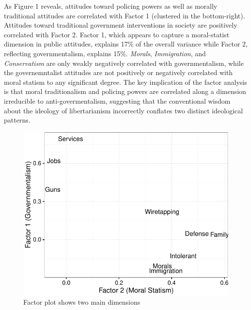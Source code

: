 \documentclass[12pt,]{article}
\begin{document}
As Figure 1 reveals, attitudes toward policing powers as well as morally
traditional attitudes are correlated with Factor 1 (clustered in the
bottom-right). Attitudes toward traditional government interventions in
society are positively correlated with Factor 2. Factor 1, which appears
to capture a moral-statist dimension in public attitudes, explains 17\%
of the overall variance while Factor 2, reflecting governmentalism,
explains 15\%. \emph{Morals}, \emph{Immigration}, and
\emph{Conservatism} are only weakly negatively correlated with
governmentalism, while the governemntalist attitudes are not positively
or negatively correlated with moral statism to any significant degree.
The key implication of the factor analysis is that moral traditionalism
and policing powers are correlated along a dimension irreducible to
anti-govermentalism, suggesting that the conventional wisdom about the
ideology of libertarianism incorrectly conflates two distinct
ideological patterns.

\begin{figure}[htbp]
\centering
\includegraphics{figures/factorplot-1.pdf}
\caption{Factor plot shows two main dimensions}
\end{figure}
\end{document}
